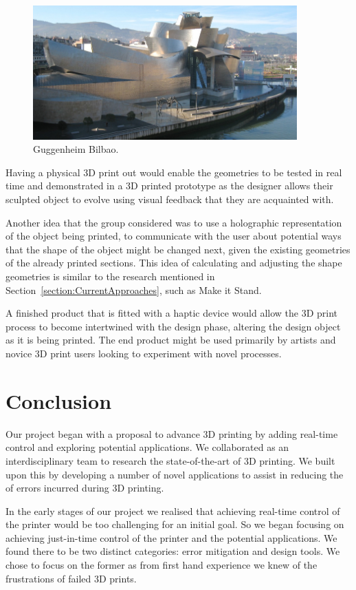 \documentclass[pdftex, 11pt]{report} %
\begin{document}
\begin{figure}[H]
  \centering
  \includegraphics[width=4in]{GuggenheimBilbao.png}
  \caption{Guggenheim Bilbao.}
  \label{figure:GuggenheimBilbao}
\end{figure}

Having a physical 3D print out would enable the geometries to be tested in real time and demonstrated in a 3D printed prototype as the designer allows their sculpted object to evolve using visual feedback that they are acquainted with. 

	Another idea that the group considered was to use a holographic representation of the object being printed, to communicate with the user about potential ways that the shape of the object might be changed next, given the existing geometries of the already printed sections. This idea of calculating and adjusting the shape geometries is similar to the research mentioned in Section~\ref{section:CurrentApproaches}, such as Make it Stand.

	A finished product that is fitted with a haptic device would allow the 3D print process to become intertwined with the design phase, altering the design object as it is being printed. The end product might be used primarily by artists and novice 3D print users looking to experiment with novel processes.   



\chapter{Conclusion}
Our project began with a proposal to advance 3D printing by adding real-time control and exploring potential applications. We collaborated as an interdisciplinary team to research the state-of-the-art of 3D printing. We built upon this by developing a number of novel applications to assist in reducing the of errors incurred during 3D printing. 

In the early stages of our project we realised that achieving real-time control of the printer would be too challenging for an initial goal. So we began focusing on achieving just-in-time control of the printer and the potential applications. We found there to be two distinct categories: error mitigation and design tools. We chose to focus on the former as from first hand experience we knew of the frustrations of failed 3D prints.   
\end{document}
